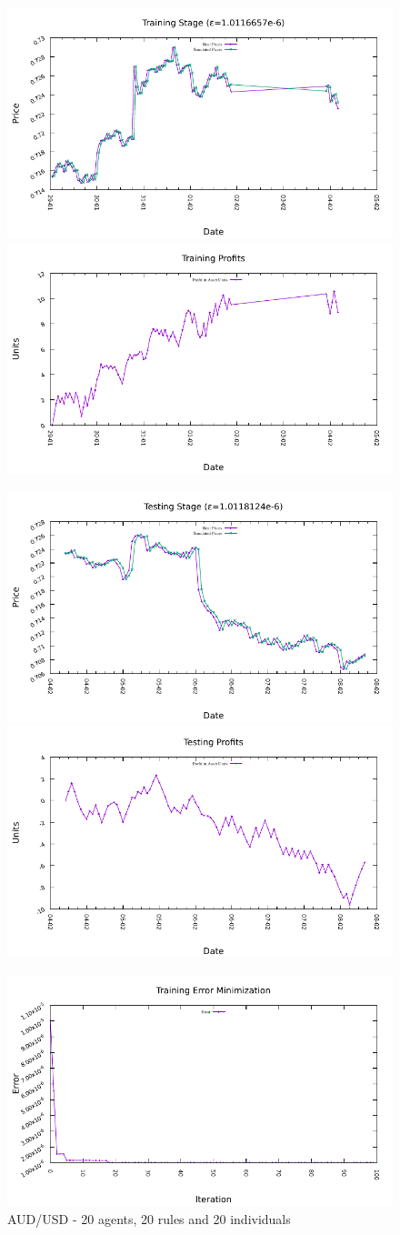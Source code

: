 \begin{figure}[htp]
  \centering

  \includegraphics[width=.45\textwidth]{img/plots/aud_usd_h1-20agents-20rules-20ind-100gen_training_fit.pdf}\quad
  \includegraphics[width=.45\textwidth]{img/plots/aud_usd_h1-20agents-20rules-20ind-100gen_training_profits.pdf}

  \medskip

  \includegraphics[width=.45\textwidth]{img/plots/aud_usd_h1-20agents-20rules-20ind-100gen_testing_fit.pdf}\quad
  \includegraphics[width=.45\textwidth]{img/plots/aud_usd_h1-20agents-20rules-20ind-100gen_testing_profits.pdf}

  \medskip

  \includegraphics[width=.45\textwidth]{img/plots/aud_usd_h1-20agents-20rules-20ind-100gen_error_minimization.pdf}

  \caption{AUD/USD - 20 agents, 20 rules and 20 individuals}
  \label{figure:aud-usd-20agents-20rules-20individuals}
\end{figure}






